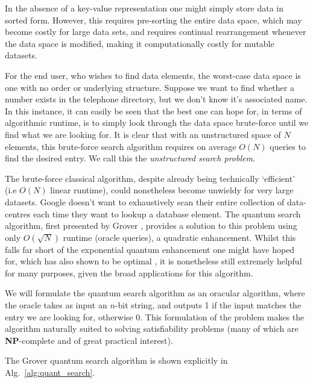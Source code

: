 In the absence of a key-value representation one might simply store data in sorted form. However, this requires pre-sorting the entire data space, which may become costly for large data sets, and requires continual rearrangement whenever the data space is modified, making it computationally costly for mutable datasets.

For the end user, who wishes to find data elements, the worst-case data space is one with no order or underlying structure. Suppose we want to find whether a number exists in the telephone directory, but we don't know it's associated name. In this instance, it can easily be seen that the best one can hope for, in terms of algorithmic runtime, is to simply look through the data space brute-force until we find what we are looking for. It is clear that with an unstructured space of $N$ elements, this brute-force search algorithm requires on average $O(N)$ queries to find the desired entry. We call this the \textit{unstructured search problem}.

The brute-force classical algorithm, despite already being technically `efficient' (i.e $O(N)$ linear runtime), could nonetheless become unwieldy for very large datasets. Google doesn't want to exhaustively scan their entire collection of data-centres each time they want to lookup a database element. The quantum search algorithm, first presented by Grover \cite{grover1997quantum}, provides a solution to this problem using only $O(\sqrt{N})$ runtime (oracle queries), a quadratic enhancement. Whilst this falls far short of the exponential quantum enhancement one might have hoped for, which has also shown to be optimal \cite{bennett1997strengths, zalka1999grover}, it is nonetheless still extremely helpful for many purposes, given the broad applications for this algorithm.

We will formulate the quantum search algorithm as an oracular algorithm, where the oracle takes as input an $n$-bit string, and outputs 1 if the input matches the entry we are looking for, otherwise 0. This formulation of the problem makes the algorithm naturally suited to solving satisfiability problems (many of which are \textbf{NP}-complete and of great practical interest).

The Grover quantum search algorithm is shown explicitly in Alg.~\ref{alg:quant_search}.

